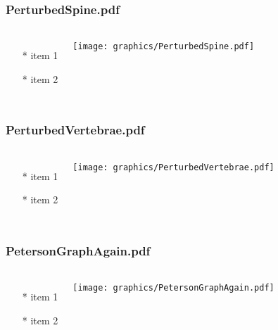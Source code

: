\begin{frame} \frametitle{PerturbedSpine.pdf}
    \begin{columns}[c]
        \begin{itemize}
            \item[*] item 1
            \item[*] item 2
        \end{itemize}
        \begin{minipage}{\linewidth}
            \begin{center}
            \texttt{[image: graphics/PerturbedSpine.pdf]}
            \label{gfx:PerturbedSpine.pdf}
            \end{center}
        \end{minipage}
    \end{columns}
\end{frame}
\begin{frame} \frametitle{PerturbedVertebrae.pdf}
    \begin{columns}[c]
        \begin{itemize}
            \item[*] item 1
            \item[*] item 2
        \end{itemize}
        \begin{minipage}{\linewidth}
            \begin{center}
            \texttt{[image: graphics/PerturbedVertebrae.pdf]}
            \label{gfx:PerturbedVertebrae.pdf}
            \end{center}
        \end{minipage}
    \end{columns}
\end{frame}
\begin{frame} \frametitle{PetersonGraphAgain.pdf}
    \begin{columns}[c]
        \begin{itemize}
            \item[*] item 1
            \item[*] item 2
        \end{itemize}
        \begin{minipage}{\linewidth}
            \begin{center}
            \texttt{[image: graphics/PetersonGraphAgain.pdf]}
            \label{gfx:PetersonGraphAgain.pdf}
            \end{center}
        \end{minipage}
    \end{columns}
\end{frame}
